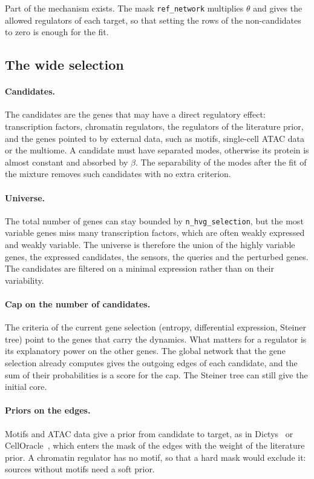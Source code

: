\documentclass[a4paper, 11pt]{article}
\theoremstyle{plain}
\theoremstyle{remark}
\begin{document}
Part of the mechanism exists. The mask \texttt{ref\_network} multiplies $\theta$ and gives the allowed regulators of each target, so that setting the rows of the non-candidates to zero is enough for the fit.

\subsection{The wide selection}\label{sec:wide}

\paragraph{Candidates.} The candidates are the genes that may have a direct regulatory effect: transcription factors, chromatin regulators, the regulators of the literature prior, and the genes pointed to by external data, such as motifs, single-cell ATAC data or the multiome. A candidate must have separated modes, otherwise its protein is almost constant and absorbed by $\beta$. The separability of the modes after the fit of the mixture removes such candidates with no extra criterion.

\paragraph{Universe.} The total number of genes can stay bounded by \texttt{n\_hvg\_selection}, but the most variable genes miss many transcription factors, which are often weakly expressed and weakly variable. The universe is therefore the union of the highly variable genes, the expressed candidates, the sensors, the queries and the perturbed genes. The candidates are filtered on a minimal expression rather than on their variability.

\paragraph{Cap on the number of candidates.} The criteria of the current gene selection (entropy, differential expression, Steiner tree) point to the genes that carry the dynamics. What matters for a regulator is its explanatory power on the other genes. The global network that the gene selection already computes gives the outgoing edges of each candidate, and the sum of their probabilities is a score for the cap. The Steiner tree can still give the initial core.

\paragraph{Priors on the edges.} Motifs and ATAC data give a prior from candidate to target, as in Dictys~\cite{wang2023dictys} or CellOracle~\cite{kamimoto2023dissecting}, which enters the mask of the edges with the weight of the literature prior. A chromatin regulator has no motif, so that a hard mask would exclude it: sources without motifs need a soft prior.
\end{document}
